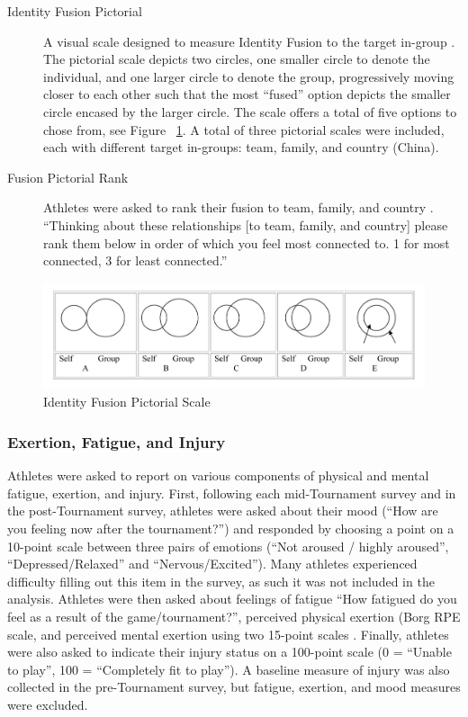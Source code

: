 \documentclass[12pt]{report}
\begin{document}
\begin{description}
\item [Identity Fusion Pictorial] A visual scale designed to measure Identity Fusion to the target in-group \citep{Swann2009}. The pictorial scale depicts two circles, one smaller circle to denote the individual, and one larger circle to denote the group, progressively moving closer to each other such that the most ``fused'' option depicts the smaller circle encased by the larger circle. The scale offers a total of five options to chose from, see Figure ~\ref{fig:fusionPictorialGroup}.  A total of three pictorial scales were included, each with different target in-groups: team, family, and country (China).
\item [Fusion Pictorial Rank] Athletes were asked to rank their fusion to team, family, and country \citep{Whitehouse2014}.  ``Thinking about these relationships [to team, family, and country] please rank them below in order of which you feel most connected to. 1 for most connected, 3 for least connected.''
\end{description}

\begin{figure}[htbp]
  \includegraphics[width=\linewidth]{../images/Identity_Fusion_Pictorial_Scale.png}
  \caption{Identity Fusion Pictorial Scale}
  \label{fig:fusionPictorialGroup}
\end{figure}


\subsubsection{Exertion, Fatigue, and Injury}
Athletes were asked to report on various components of physical and mental fatigue, exertion, and injury. First, following each mid-Tournament survey and in the post-Tournament survey, athletes were asked about their mood (``How are you feeling now after the tournament?'') and responded by choosing a point on a 10-point scale between three pairs of emotions (``Not aroused / highly aroused'',  ``Depressed/Relaxed'' and  ``Nervous/Excited'').  Many athletes experienced difficulty filling out this item in the survey, as such it was not included in the analysis. Athletes were then asked about feelings of fatigue ``How fatigued do you feel as a result of the game/tournament?'', perceived physical exertion (Borg RPE scale, \citep{Borg1990} and perceived mental exertion using two 15-point scales \citep[see][ ]{Noakes2012a}.  Finally, athletes were also asked to indicate their injury status on a 100-point scale (0 = ``Unable to play'', 100 = ``Completely fit to play'').  A baseline measure of injury was also collected in the pre-Tournament survey, but fatigue, exertion, and mood measures were excluded.
\end{document}
